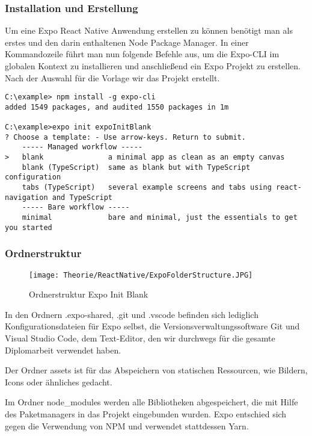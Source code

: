 \subsubsection{Installation und Erstellung}
Um eine Expo React Native Anwendung erstellen zu können benötigt man als erstes  und
den darin enthaltenen Node Package Manager. In einer Kommandozeile führt man nun folgende Befehle
aus, um die Expo-CLI im globalen Kontext zu installieren und anschließend ein Expo Projekt zu
erstellen. Nach der Auswahl für die Vorlage wir das Projekt erstellt.

\begin{lstlisting}
C:\example> npm install -g expo-cli
added 1549 packages, and audited 1550 packages in 1m

C:\example>expo init expoInitBlank
? Choose a template: - Use arrow-keys. Return to submit.
    ----- Managed workflow -----
>   blank               a minimal app as clean as an empty canvas
    blank (TypeScript)  same as blank but with TypeScript configuration
    tabs (TypeScript)   several example screens and tabs using react-navigation and TypeScript
    ----- Bare workflow -----
    minimal             bare and minimal, just the essentials to get you started
\end{lstlisting}

\subsubsection{Ordnerstruktur}
\begin{figure}[H]
  \begin{center}
    \texttt{[image: Theorie/ReactNative/ExpoFolderStructure.JPG]}
    \caption{Ordnerstruktur Expo Init Blank}
  \end{center}
\end{figure}

In den Ordnern .expo-shared, .git und .vscode befinden sich lediglich Konfigurationsdateien für Expo
selbst, die Versionsverwaltungssoftware Git und Visual Studio Code, dem Text-Editor, den wir
durchwegs für die gesamte Diplomarbeit verwendet haben.

Der Ordner assets ist für das Abspeichern von statischen Ressourcen, wie Bildern, Icons oder
ähnliches gedacht.

Im Ordner node\_modules werden alle Bibliotheken abgespeichert, die mit Hilfe des Paketmanagers
in das Projekt eingebunden wurden. Expo entschied sich gegen die Verwendung von NPM und verwendet
stattdessen Yarn.

